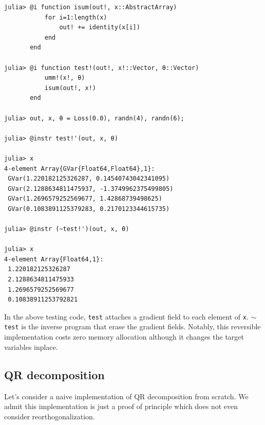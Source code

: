 \documentclass[aps,twocolumn,longbibliography,english,superscriptaddress]{revtex4-1}
\newcommand{\<}{\langle}
\renewcommand{\>}{\rangle}
\newcommand{\Tr}{{\rm Tr}}
\theoremstyle{definition}\newtheorem{definition}{\textit{Definition}}
\begin{document}
\begin{minipage}{.44\textwidth}
\begin{lstlisting}[mathescape=true]
julia> @i function isum(out!, x::AbstractArray)
           for i=1:length(x)
               out! += identity(x[i])
           end
       end

julia> @i function test!(out!, x!::Vector, θ::Vector)
           umm!(x!, θ)
           isum(out!, x!)
       end

julia> out, x, θ = Loss(0.0), randn(4), randn(6);

julia> @instr test!'(out, x, θ)

julia> x
4-element Array{GVar{Float64,Float64},1}:
 GVar(1.220182125326287, 0.14540743042341095) 
 GVar(2.1288634811475937, -1.3749962375499805)
 GVar(1.2696579252569677, 1.42868739498625)   
 GVar(0.1083891125379283, 0.2170123344615735) 

julia> @instr (~test!')(out, x, θ)

julia> x
4-element Array{Float64,1}:
 1.220182125326287  
 2.1288634811475933 
 1.2696579252569677 
 0.10838911253792821
\end{lstlisting}
\end{minipage}

In the above testing code, \texttt{test\textquotesingle} attaches a gradient field to each element of \texttt{x}. \texttt{$\sim$test\textquotesingle} is the inverse program that erase the gradient fields.
Notably, this reversible implementation costs zero memory allocation although it changes the target variables inplace.


\subsection{QR decomposition}

Let's consider a naive implementation of QR decomposition from scratch.
We admit this implementation is just a proof of principle which does not even consider reorthogonalization.
\end{document}
